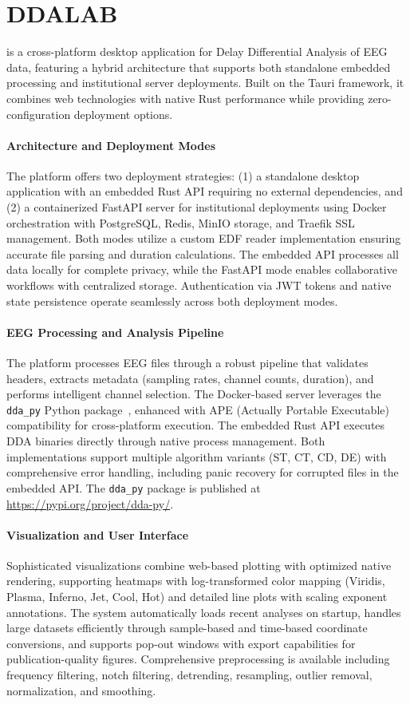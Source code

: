 \section{DDALAB}

{\DDALAB} is a cross-platform desktop application for Delay Differential Analysis of EEG data, featuring a hybrid architecture that supports both standalone embedded processing and institutional server deployments. Built on the Tauri framework, it combines web technologies with native Rust performance while providing zero-configuration deployment options.

\paragraph{Architecture and Deployment Modes}
The platform offers two deployment strategies: (1) a standalone desktop application with an embedded Rust API requiring no external dependencies, and (2) a containerized FastAPI server for institutional deployments using Docker orchestration with PostgreSQL, Redis, MinIO storage, and Traefik SSL management. Both modes utilize a custom EDF reader implementation ensuring accurate file parsing and duration calculations. The embedded API processes all data locally for complete privacy, while the FastAPI mode enables collaborative workflows with centralized storage. Authentication via JWT tokens and native state persistence operate seamlessly across both deployment modes.

\paragraph{EEG Processing and Analysis Pipeline}
The platform processes EEG files through a robust pipeline that validates headers, extracts metadata (sampling rates, channel counts, duration), and performs intelligent channel selection. The Docker-based server leverages the \verb|dda_py| Python package~\cite{dda-py}, enhanced with APE (Actually Portable Executable) compatibility for cross-platform execution. The embedded Rust API executes DDA binaries directly through native process management. Both implementations support multiple algorithm variants (ST, CT, CD, DE) with comprehensive error handling, including panic recovery for corrupted files in the embedded API. The \verb|dda_py| package is published at \url{https://pypi.org/project/dda-py/}.

\paragraph{Visualization and User Interface}
Sophisticated visualizations combine web-based plotting with optimized native rendering, supporting heatmaps with log-transformed color mapping (Viridis, Plasma, Inferno, Jet, Cool, Hot) and detailed line plots with scaling exponent annotations. The system automatically loads recent analyses on startup, handles large datasets efficiently through sample-based and time-based coordinate conversions, and supports pop-out windows with export capabilities for publication-quality figures. Comprehensive preprocessing is available including frequency filtering, notch filtering, detrending, resampling, outlier removal, normalization, and smoothing.

